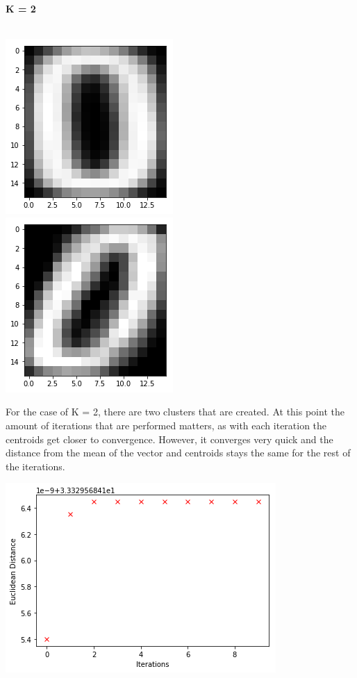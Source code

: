 \documentclass[a4paper]{article}
\begin{document}
{\newpage
\textbf{\large K = 2} \\ \\
\begin{center}
\includegraphics[scale=.85]{./k2_1.png}  \\
\includegraphics[scale=.85]{./k2_2.png}  \\
\end{center}
For the case of K = 2, there are two clusters that are created. At this point the amount of iterations that are performed matters, as with each iteration the centroids get closer to convergence. However, it converges very quick and the distance from the mean of the vector and centroids stays the same for the rest of the iterations.  \\
\begin{center}
 \includegraphics[scale=.80]{./k2plt.png} \\
\end{center} 

}
\end{document}
